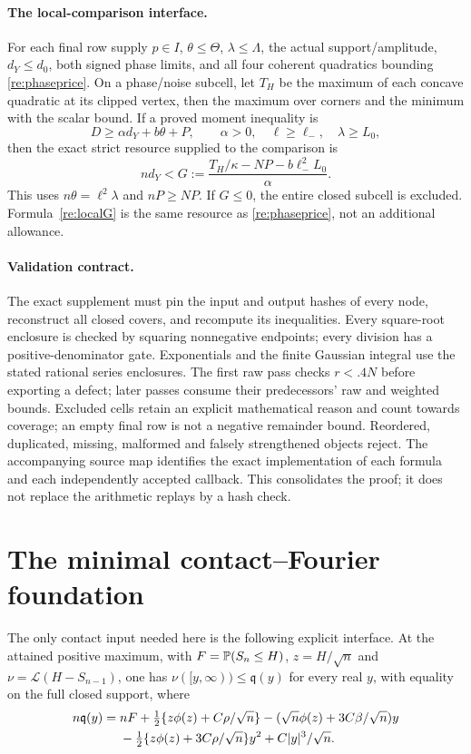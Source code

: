 \paragraph{The local-comparison interface.}
For each final row supply $p\in I$, $\theta\le\Theta$, $\lambda\le\Lambda$,
the actual support/amplitude, $d_Y\le d_0$, both signed phase limits,
and all four coherent quadratics bounding \eqref{re:phaseprice}.
On a phase/noise subcell, let $T_H$ be the maximum of each concave
quadratic at its clipped vertex, then the maximum over corners and the
minimum with the scalar bound. If a proved moment inequality is
\[
 D\ge\alpha d_Y+b\theta+P,\qquad\alpha>0,
 \quad \ell\ge\ell_-,\quad\lambda\ge L_0,
\]
then the exact strict resource supplied to the comparison is
\begin{equation}\label{re:localG}
 nd_Y<G:=\frac{T_H/\kappa-NP-b\ell_-^2L_0}{\alpha}.
\end{equation}
This uses $n\theta=\ell^2\lambda$ and $nP\ge NP$. If $G\le0$,
the entire closed subcell is excluded. Formula~\eqref{re:localG} is
the same resource as \eqref{re:phaseprice}, not an additional allowance.

\paragraph{Validation contract.}
The exact supplement must pin the input and output hashes of every
node, reconstruct all closed covers, and recompute its inequalities.
Every square-root enclosure is checked by squaring nonnegative endpoints;
every division has a positive-denominator gate. Exponentials and the
finite Gaussian integral use the stated rational series enclosures.
The first raw pass checks $r<.4N$ before exporting a defect; later passes
consume their predecessors' raw and weighted bounds. Excluded cells
retain an explicit mathematical reason and count towards coverage;
an empty final row is not a negative remainder bound. Reordered,
duplicated, missing, malformed and falsely strengthened objects reject.
The accompanying source map identifies the exact implementation of each
formula and each independently accepted callback. This consolidates the
proof; it does not replace the arithmetic replays by a hash check.




\section{The minimal contact--Fourier foundation}\label{re:foundation}
The only contact input needed here is the following explicit interface.
At the attained positive maximum, with $F=\mathbb P(S_n\le H)$,
$z=H/\sqrt n$ and $\nu=\mathcal L(H-S_{n-1})$, one has
$\nu([y,\infty))\le\mathfrak q(y)$ for every real $y$, with equality
on the full closed support, where
\begin{align}
 n\mathfrak q(y)={}&nF+\tfrac12\{z\phi(z)+C\rho/\sqrt n\}
 -(\sqrt n\phi(z)+3C\beta/\sqrt n)y\notag\\
 &-\tfrac12\{z\phi(z)+3C\rho/\sqrt n\}y^2
 +C|y|^3/\sqrt n.\label{re:contact-q}
\end{align}

